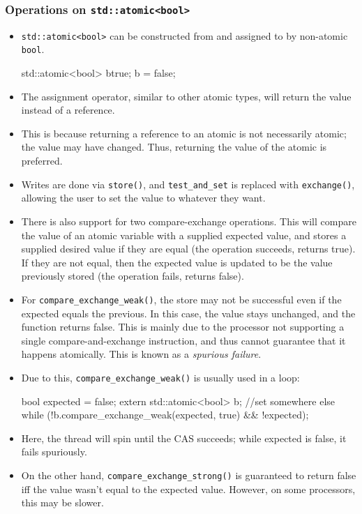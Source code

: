 \documentclass[11pt, a4paper]{article}
\theoremstyle{definition}
\theoremstyle{remark}
\newcommand{\code}[1]{\lstinline|#1|}
\begin{document}
\subsubsection{Operations on \texorpdfstring{\code{std::atomic<bool>}}{std::atomic<bool>}}
\begin{itemize}
    \item \code{std::atomic<bool>} can be constructed from and assigned to by non-atomic \code{bool}. 
\begin{cppcode}
std::atomic<bool> b{true};
b = false;
\end{cppcode}
    \item The assignment operator, similar to other atomic types, will return the value instead of a reference. 
    \item This is because returning a reference to an atomic is not necessarily atomic; the value may have changed. Thus, returning the value of the atomic is preferred. 
    \item Writes are done via \code{store()}, and \code{test_and_set} is replaced with \code{exchange()}, allowing the user to set the value to whatever they want. 
    \item There is also support for two compare-exchange operations. This will compare the value of an atomic variable with a supplied expected value, and stores a supplied desired value if they are equal (the operation succeeds, returns true). If they are not equal, then the expected value is updated to be the value previously stored (the operation fails, returns false). 
    \item For \code{compare_exchange_weak()}, the store may not be successful even if the expected equals the previous. In this case, the value stays unchanged, and the function returns false. This is mainly due to the processor not supporting a single compare-and-exchange instruction, and thus cannot guarantee that it happens atomically. This is known as a \textit{spurious failure}. 
    \item Due to this, \code{compare_exchange_weak()} is usually used in a loop: 
\begin{cppcode}
bool expected = false;
extern std::atomic<bool> b; //set somewhere else 
while (!b.compare_exchange_weak(expected, true) && !expected);
\end{cppcode}
    \item Here, the thread will spin until the CAS succeeds; while expected is false, it fails spuriously. 
    \item On the other hand, \code{compare_exchange_strong()} is guaranteed to return false iff the value wasn't equal to the expected value. However, on some processors, this may be slower.

\end{itemize}
\end{document}
